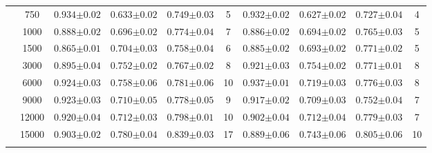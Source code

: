 \begin{table}[H]
\begin{tabularx}{\textwidth}{cc | YYYc | YYYc }
        & 750 & $0.934{\scriptscriptstyle\pm0.02}$ & $0.633{\scriptscriptstyle\pm0.02}$ & $0.749{\scriptscriptstyle\pm0.03}$ & 5 & $0.932{\scriptscriptstyle\pm0.02}$ & $0.627{\scriptscriptstyle\pm0.02}$ & $0.727{\scriptscriptstyle\pm0.04}$ & 4\\
        & 1000 & $0.888{\scriptscriptstyle\pm0.02}$ & $0.696{\scriptscriptstyle\pm0.02}$ & $0.774{\scriptscriptstyle\pm0.04}$ & 7 & $0.886{\scriptscriptstyle\pm0.02}$ & $0.694{\scriptscriptstyle\pm0.02}$ & $0.765{\scriptscriptstyle\pm0.03}$ & 5\\
        & 1500 & $0.865{\scriptscriptstyle\pm0.01}$ & $0.704{\scriptscriptstyle\pm0.03}$ & $0.758{\scriptscriptstyle\pm0.04}$ & 6 & $0.885{\scriptscriptstyle\pm0.02}$ & $0.693{\scriptscriptstyle\pm0.02}$ & $0.771{\scriptscriptstyle\pm0.02}$ & 5\\
        & 3000 & $0.895{\scriptscriptstyle\pm0.04}$ & $0.752{\scriptscriptstyle\pm0.02}$ & $0.767{\scriptscriptstyle\pm0.02}$ & 8 & $0.921{\scriptscriptstyle\pm0.03}$ & $0.754{\scriptscriptstyle\pm0.02}$ & $0.771{\scriptscriptstyle\pm0.01}$ & 8\\
        & 6000 & $0.924{\scriptscriptstyle\pm0.03}$ & $0.758{\scriptscriptstyle\pm0.06}$ & $0.781{\scriptscriptstyle\pm0.06}$ & 10 & $0.937{\scriptscriptstyle\pm0.01}$ & $0.719{\scriptscriptstyle\pm0.03}$ & $0.776{\scriptscriptstyle\pm0.03}$ & 8\\
        & 9000 & $0.923{\scriptscriptstyle\pm0.03}$ & $0.710{\scriptscriptstyle\pm0.05}$ & $0.778{\scriptscriptstyle\pm0.05}$ & 9 & $0.917{\scriptscriptstyle\pm0.02}$ & $0.709{\scriptscriptstyle\pm0.03}$ & $0.752{\scriptscriptstyle\pm0.04}$ & 7\\
        & 12000 & $0.920{\scriptscriptstyle\pm0.04}$ & $0.712{\scriptscriptstyle\pm0.03}$ & $0.798{\scriptscriptstyle\pm0.01}$ & 10 & $0.902{\scriptscriptstyle\pm0.04}$ & $0.712{\scriptscriptstyle\pm0.04}$ & $0.779{\scriptscriptstyle\pm0.03}$ & 7\\
        & 15000 & $0.903{\scriptscriptstyle\pm0.02}$ & $0.780{\scriptscriptstyle\pm0.04}$ & $0.839{\scriptscriptstyle\pm0.03}$ & 17 & $0.889{\scriptscriptstyle\pm0.06}$ & $0.743{\scriptscriptstyle\pm0.06}$ & $0.805{\scriptscriptstyle\pm0.06}$ & 10\\
         \\
    \end{tabularx}
\end{table}

